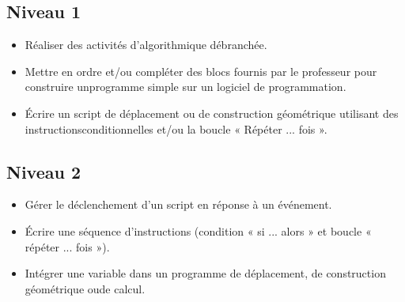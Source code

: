 \documentclass[a4paper,12pt,fleqn]{article}	
\begin{document}
\renewcommand{\labelitemi}{}

\subsection*{Niveau 1}

\begin{itemize}
	\item {}Réaliser des activités d’algorithmique débranchée.
	\item {}Mettre en ordre et/ou compléter des blocs fournis par le professeur pour construire unprogramme simple sur un logiciel de programmation.
	\item {}Écrire un script de déplacement ou de construction géométrique utilisant des instructionsconditionnelles et/ou la boucle « Répéter ... fois ».
\end{itemize}
	
\subsection*{Niveau 2}

\begin{itemize}
	\item {}Gérer le déclenchement d'un script en réponse à un événement.
	\item {}Écrire une séquence d’instructions (condition « si ... alors » et boucle « répéter ... fois »).
	\item {}Intégrer une variable dans un programme de déplacement, de construction géométrique oude calcul.
\end{itemize}
\end{document}

